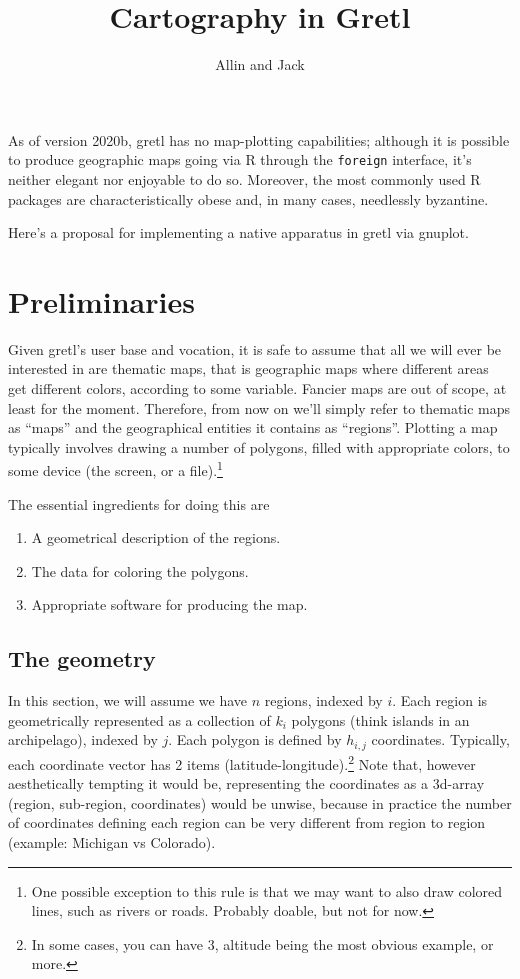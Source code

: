 \documentclass[a4paper]{article}
\title{Cartography in Gretl}
\author{Allin and Jack}
\begin{document}
\maketitle

As of version 2020b, gretl has no map-plotting capabilities; although
it is possible to produce geographic maps going via R through the
\texttt{foreign} interface, it's neither elegant nor enjoyable to do
so. Moreover, the most commonly used R packages are characteristically
obese and, in many cases, needlessly byzantine.

Here's a proposal for implementing a native apparatus in gretl via gnuplot.

\section{Preliminaries}
\label{sec:prelim}

Given gretl's user base and vocation, it is safe to assume that all we
will ever be interested in are thematic maps, that is geographic maps
where different areas get different colors, according to some
variable. Fancier maps are out of scope, at least for the
moment. Therefore, from now on we'll simply refer to thematic maps as
``maps'' and the geographical entities it contains as
``regions''. Plotting a map typically involves drawing a number of
polygons, filled with appropriate colors, to some device (the screen,
or a file).\footnote{One possible exception to this rule is that we
  may want to also draw colored lines, such as rivers or
  roads. Probably doable, but not for now.}

The essential ingredients for doing this are
\begin{enumerate}
   \item A geometrical description of the regions.
   \item The data for coloring the polygons.
   \item Appropriate software for producing the map. 
\end{enumerate}
   
\subsection{The geometry}
\label{sec:geometry}

In this section, we will assume we have $n$ regions, indexed by
$i$. Each region is geometrically represented as a collection of $k_i$
polygons (think islands in an archipelago), indexed by $j$. Each
polygon is defined by $h_{i,j}$ coordinates. Typically, each
coordinate vector has 2 items (latitude-longitude).\footnote{In some
  cases, you can have 3, altitude being the most obvious example, or
  more.}  Note that, however aesthetically tempting it would be,
representing the coordinates as a 3d-array (region, sub-region,
coordinates) would be unwise, because in practice the number of
coordinates defining each region can be very different from region to
region (example: Michigan vs Colorado).
\end{document}
